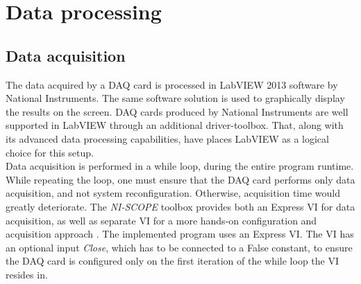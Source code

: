 \documentclass{standalone}
\begin{document}
\chapter{Data processing} \label{ch:data_processing}
\setcounter{page}\thestranica


\section{Data acquisition}

The data acquired by a DAQ card is processed in LabVIEW 2013 software by National Instruments. The same software solution is used to graphically display the results on the screen. DAQ cards produced by National Instruments are well supported in LabVIEW through an additional driver-toolbox. That, along with its advanced data processing capabilities, have places LabVIEW as a logical choice for this setup. \\

Data acquisition is performed in a while loop, during the entire program runtime. While repeating the loop, one must ensure that the DAQ card performs only data acquisition, and not system reconfiguration. Otherwise, acquisition time would greatly deteriorate. The \textit{NI-SCOPE} toolbox provides both an Express VI for data acquisition, as well as separate VI for a more hands-on configuration and acquisition approach \cite{labview:niscope}. The implemented program uses an Express VI. The VI has an optional input \textit{Close}, which has to be connected to a False constant, to ensure the DAQ card is configured only on the first iteration of the while loop the VI resides in. \\
\end{document}
